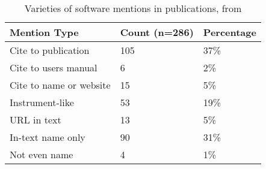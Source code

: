 \documentclass[11pt, oneside]{amsart}
\begin{document}
\begin{table}[htbp]
\caption{Varieties of software mentions in publications, from  \cite{howison2015jasist}} 
\centering
\scriptsize\setlength{\tabcolsep}{2.5pt}
\begin{tabular}{@{}l l l } %
\toprule
Mention Type & Count (n=286) & Percentage\\ %
\midrule
Cite to publication     & 105 & 37\% \\ %
Cite to users manual    & 6   & 2\%  \\ %
Cite to name or website & 15  & 5\%  \\ %
Instrument-like         & 53  & 19\% \\ %
URL in text             & 13  & 5\%  \\ %
In-text name only       & 90  & 31\% \\ %
Not even name           & 4   & 1\%  \\ %
\bottomrule
\end{tabular}
\label{tab:mentions}
\end{table}%
\end{document}

